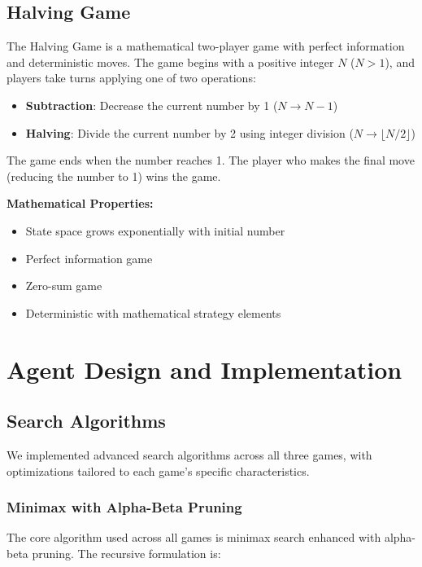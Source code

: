 \documentclass[12pt]{article}
\begin{document}
\subsection{Halving Game}

The Halving Game is a mathematical two-player game with perfect information and deterministic moves. The game begins with a positive integer $N$ ($N > 1$), and players take turns applying one of two operations:

\begin{itemize}
    \item \textbf{Subtraction}: Decrease the current number by 1 ($N \rightarrow N-1$)
    \item \textbf{Halving}: Divide the current number by 2 using integer division ($N \rightarrow \lfloor N/2 \rfloor$)
\end{itemize}

The game ends when the number reaches 1. The player who makes the final move (reducing the number to 1) wins the game.

\textbf{Mathematical Properties:}
\begin{itemize}
    \item State space grows exponentially with initial number
    \item Perfect information game
    \item Zero-sum game
    \item Deterministic with mathematical strategy elements
\end{itemize}

\section{Agent Design and Implementation}

\subsection{Search Algorithms}

We implemented advanced search algorithms across all three games, with optimizations tailored to each game's specific characteristics.

\subsubsection{Minimax with Alpha-Beta Pruning}

The core algorithm used across all games is minimax search enhanced with alpha-beta pruning. The recursive formulation is:
\end{document}
